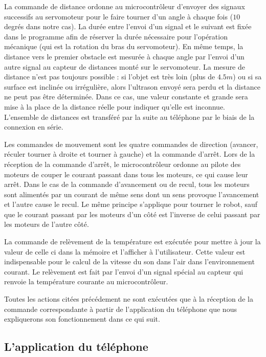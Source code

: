 La commande de distance ordonne au microcontrôleur d'envoyer des signaux
successifs au servomoteur pour le faire tourner d'un angle à chaque fois ($10$ degrés
dans notre cas). La durée entre l'envoi d'un signal et le suivant est fixée dans
le programme afin de réserver la durée nécessaire pour l'opération mécanique (qui
est la rotation du bras du servomoteur). En même temps, la distance vers le
premier obstacle est mesurée à chaque angle par l'envoi d'un autre signal au capteur
de distances monté sur le servomoteur. La mesure de distance n'est pas toujours
possible : si l'objet est très loin (plus de $4.5m$) ou si sa surface est inclinée
ou irrégulière, alors l'ultrason envoyé sera perdu et la distance ne peut pas être
déterminée. Dans ce cas, une valeur constante et grande sera mise à la place de la
distance réelle pour indiquer qu'elle est inconnue. L'ensemble de distances est
transféré par la suite au téléphone par le biais de la connexion en série.

Les commandes de mouvement sont les quatre commandes de direction (avancer, réculer
tourner à droite et tourner à gauche) et la commande d'arrêt. Lors de la
réception de la commande d'arrêt, le microcontrôleur ordonne au pilote des moteurs
de couper le courant passant dans tous les moteurs, ce qui cause leur arrêt. Dans
le cas de la commande d'avancement ou de recul, tous les moteurs sont alimentés
par un courant de même sens dont un sens provoque l'avancement et l'autre cause
le recul. Le même principe s'applique pour tourner le robot, sauf que le courant
passant par les moteurs d'un côté est l'inverse de celui passant par les moteurs
de l'autre côté.

La commande de relèvement de la température est exécutée pour
mettre à jour la valeur de celle ci dans la mémoire et l'afficher à l'utilisateur.
Cette valeur est indispensable pour le calcul de la vitesse du son dans l'air
dans l'environnement courant. Le relèvement est fait par l'envoi d'un signal spécial
au capteur qui renvoie la température courante au microcontrôleur.

Toutes les actions citées précédement ne sont exécutées que à la réception de
la commande correspondante à partir de l'application du téléphone que nous expliquerons
son fonctionnement dans ce qui suit.

\subsection{L'application du téléphone}

